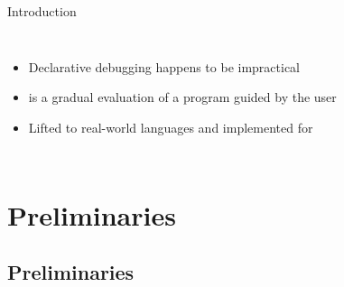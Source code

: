 \documentclass{beamer}
\begin{document}
\begin{frame}{Introduction}
\begin{columns}[b]
		\onslide<+->


		\begin{columns}[b]


			\begin{itemize}
				\item Declarative debugging happens to be impractical
				\onslide<+->
				\item {} is a gradual evaluation of a program guided by the user
				\item Lifted to real-world languages and implemented for \sealion
			\end{itemize}

		\end{columns}

	\end{columns}
	
\end{frame}
% 
% 	
% 	



\section{Preliminaries}


\subsection{Preliminaries}
\end{document}
